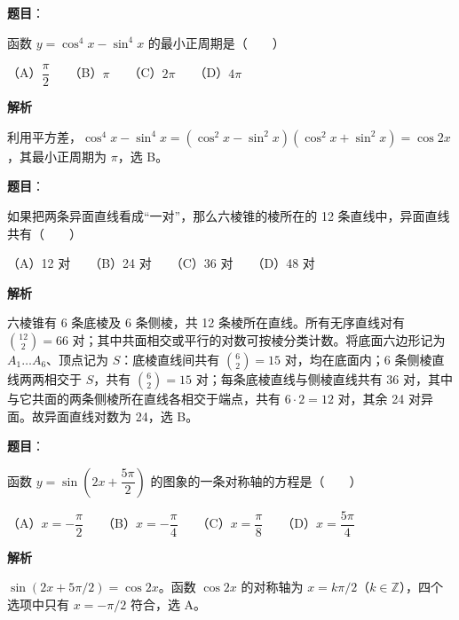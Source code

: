 \begin{answer}

\textbf{题目}：

函数 $y=\cos^4x-\sin^4x$ 的最小正周期是\mbox{（　　）}

（A）$\dfrac\pi2$　　（B）$\pi$　　（C）$2\pi$　　（D）$4\pi$

\textbf{解析}

利用平方差，$\cos^4x-\sin^4x=(\cos^2x-\sin^2x)(\cos^2x+\sin^2x)=\cos2x$，其最小正周期为 $\pi$，选 B。


\end{answer}
\begin{answer}

\textbf{题目}：

如果把两条异面直线看成“一对”，那么六棱锥的棱所在的 12 条直线中，异面直线共有\mbox{（　　）}

（A）12 对　　（B）24 对　　（C）36 对　　（D）48 对

\textbf{解析}

六棱锥有 6 条底棱及 6 条侧棱，共 12 条棱所在直线。所有无序直线对有 $\binom{12}{2}=66$ 对；其中共面相交或平行的对数可按棱分类计数。将底面六边形记为 $A_1\dots A_6$、顶点记为 $S$：底棱直线间共有 $\binom62=15$ 对，均在底面内；6 条侧棱直线两两相交于 $S$，共有 $\binom62=15$ 对；每条底棱直线与侧棱直线共有 36 对，其中与它共面的两条侧棱所在直线各相交于端点，共有 $6\cdot2=12$ 对，其余 24 对异面。故异面直线对数为 24，选 B。


\end{answer}
\begin{answer}

\textbf{题目}：

函数 $y=\sin\left(2x+\dfrac{5\pi}{2}\right)$ 的图象的一条对称轴的方程是\mbox{（　　）}

（A）$x=-\dfrac\pi2$　　（B）$x=-\dfrac\pi4$　　（C）$x=\dfrac\pi8$　　（D）$x=\dfrac{5\pi}4$

\textbf{解析}

$\sin(2x+5\pi/2)=\cos2x$。函数 $\cos2x$ 的对称轴为 $x=k\pi/2$（$k\in\mathbb Z$），四个选项中只有 $x=-\pi/2$ 符合，选 A。


\end{answer}
